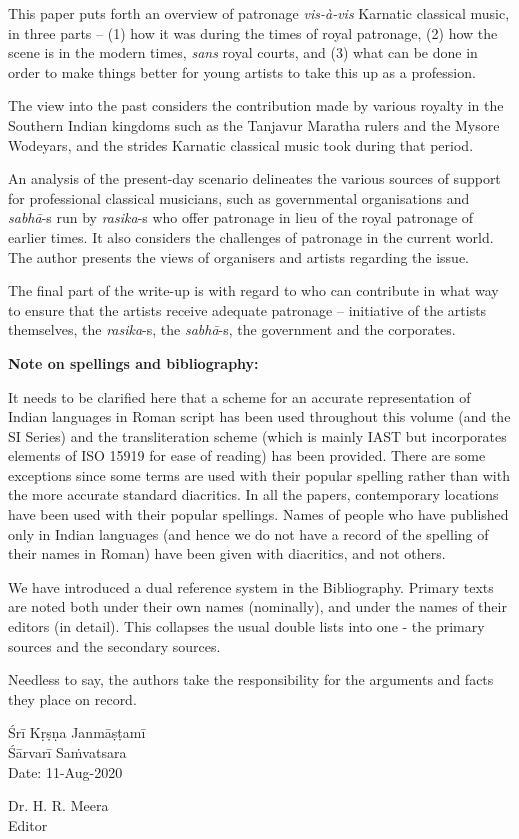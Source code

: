 This paper puts forth an overview of patronage \textit{vis-à-vis} Karnatic classical music, in three parts – (1) how it was during the times of royal patronage, (2) how the scene is in the modern times, \textit{sans} royal courts, and (3) what can be done in order to make things better for young artists to take this up as a profession.

The view into the past considers the contribution made by various royalty in the Southern Indian kingdoms such as the Tanjavur Maratha rulers and the Mysore Wodeyars, and the strides Karnatic classical music took during that period.

An analysis of the present-day scenario delineates the various sources of support for professional classical musicians, such as governmental organisations and \textit{sabhā}-s run by \textit{rasika}-s who offer patronage in lieu of the royal patronage of earlier times. It also considers the challenges of patronage in the current world. The author presents the views of organisers and artists regarding the issue.

The final part of the write-up is with regard to who can contribute in what way to ensure that the artists receive adequate patronage – initiative of the artists themselves, the \textit{rasika}-s, the \textit{sabhā}-s, the government and the corporates.

\delimiter

\textbf{Note on spellings and bibliography: }

It needs to be clarified here that a scheme for an accurate representation of Indian languages in Roman script has been used throughout this volume (and the SI Series) and the transliteration scheme (which is mainly IAST but incorporates elements of ISO 15919 for ease of reading) has been provided. There are some exceptions since some terms are used with their popular spelling rather than with the more accurate standard diacritics. In all the papers, contemporary locations have been used with their popular spellings. Names of people who have published only in Indian languages (and hence we do not have a record of the spelling of their names in Roman) have been given with diacritics, and not others.

We have introduced a dual reference system in the Bibliography. Primary texts are noted both under their own names (nominally), and under the names of their editors (in detail). This collapses the usual double lists into one - the primary sources and the secondary sources.

Needless to say, the authors take the responsibility for the arguments and facts they place on record.

\vspace{.2cm}

Śrī Kṛṣṇa Janmāṣṭamī\\ Śārvarī Saṁvatsara\\ Date: 11-Aug-2020

\vspace{-1.7cm}

\begin{flushright}
Dr. H. R. Meera\\ Editor
\end{flushright}

\theendnotes

